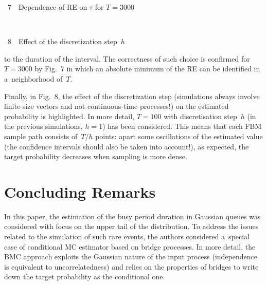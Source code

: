 \begin{multicols}{2}
{\begin{center}
\noindent
{{\figurename~7}\ \ \small{Dependence of RE on $\tau$ for $T=3000$}}

\end{center}
}


{ \begin{center}  %
 \vspace*{12pt}
\mbox{%
\epsfxsize=79.023mm
}


\vspace*{3pt}


\noindent
{{\figurename~8}\ \ \small{Effect of the  discretization step~$h$}}

\end{center}
}

\vspace*{9pt}



\noindent
 to the duration of the interval. The correctness 
of such choice is confirmed for $T=3000$ by Fig.~7 in which an absolute
 minimum of the RE can be identified in a~neighborhood of~$T$.
 



Finally, in Fig.~8, the effect of the discretization step (simulations 
always involve finite-size vectors and not continuous-time processes!) 
on the estimated probability is highlighted. In more detail, $T=100$
 with discretisation step~$h$ (in the previous simulations, $h=1$) has
 been considered. This means that 
 each FBM sample path consists of~$T/h$ points: apart some oscillations of the 
 estimated value (the confidence intervals should also be taken into account!), 
 as expected, the target probability decreases when sampling is more dense.


\vspace*{-6pt}



\section{Concluding Remarks}

\vspace*{-2pt}

\noindent
In this paper,  the estimation of the busy period duration in 
Gaussian queues was considered with focus on the upper tail of the distribution. To address the 
issues related to the simulation of such rare events,
the authors considered a~special case 
of conditional MC estimator based on bridge processes. In more detail, 
the BMC approach exploits the Gaussian nature of the input process (independence 
is equivalent to uncorrelatedness) and relies on the properties of bridges to 
write down the target probability as the conditional one.


\end{multicols}

